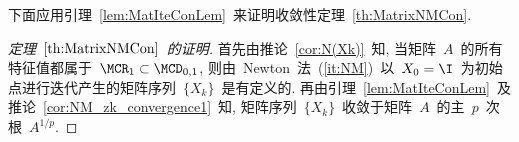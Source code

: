 
下面应用引理~\ref{lem:MatIteConLem}~来证明收敛性定理~\ref{th:MatrixNMCon}.

\begin{proof}[定理~$\ref{th:MatrixNMCon}$~的证明]

首先由推论~\ref{cor:N(Xk)}~知, 当矩阵~$A$~的所有特征值都属于~$\MCR_1
\subset \MCD_{0,1}$, 则由~Newton~法~(\ref{it:NM})~以~$X_0 =
\I$~为初始点进行迭代产生的矩阵序列~$\{X_k\}$~是有定义的.
再由引理~\ref{lem:MatIteConLem}~及推论~\ref{cor:NM_zk_convergence1}~知,
矩阵序列~$\{X_k\}$~收敛于矩阵~$A$~的主~$p$~次根~$A^{1/p}$.



\end{proof}

